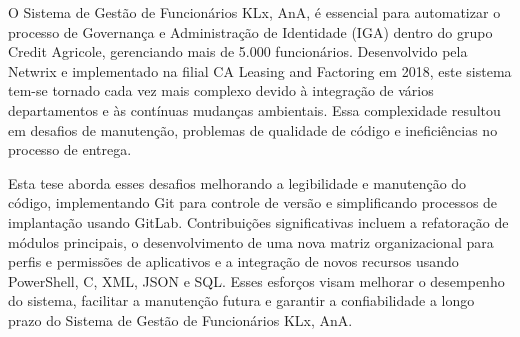 
O Sistema de Gestão de Funcionários KLx, AnA, é essencial para automatizar o processo de Governança e Administração de Identidade (IGA) dentro do grupo Credit Agricole, gerenciando mais de 5.000 funcionários. Desenvolvido pela Netwrix e implementado na filial CA Leasing and Factoring em 2018, este sistema tem-se tornado cada vez mais complexo devido à integração de vários departamentos e às contínuas mudanças ambientais. Essa complexidade resultou em desafios de manutenção, problemas de qualidade de código e ineficiências no processo de entrega.

Esta tese aborda esses desafios melhorando a legibilidade e manutenção do código, implementando Git para controle de versão e simplificando processos de implantação usando GitLab. Contribuições significativas incluem a refatoração de módulos principais, o desenvolvimento de uma nova matriz organizacional para perfis e permissões de aplicativos e a integração de novos recursos usando PowerShell, C, XML, JSON e SQL. Esses esforços visam melhorar o desempenho do sistema, facilitar a manutenção futura e garantir a confiabilidade a longo prazo do Sistema de Gestão de Funcionários KLx, AnA.

